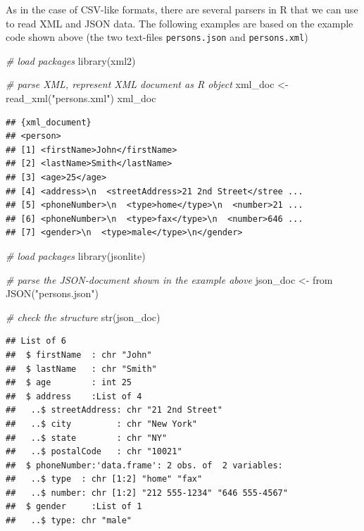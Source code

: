 \documentclass[
  12pt,
]{style/krantz}
\newenvironment{Shaded}{\begin{snugshade}}{\end{snugshade}}
\newcommand{\CommentTok}[1]{\textcolor[rgb]{0.56,0.35,0.01}{\textit{#1}}}
\newcommand{\FunctionTok}[1]{\textcolor[rgb]{0.00,0.00,0.00}{#1}}
\newcommand{\NormalTok}[1]{#1}
\newcommand{\OtherTok}[1]{\textcolor[rgb]{0.56,0.35,0.01}{#1}}
\newcommand{\StringTok}[1]{\textcolor[rgb]{0.31,0.60,0.02}{#1}}
\begin{document}
As in the case of CSV-like formats, there are several parsers in R that we can use to read XML and JSON data. The following examples are based on the example code shown above (the two text-files \texttt{persons.json} and \texttt{persons.xml})

\begin{Shaded}
\begin{Highlighting}[]
\CommentTok{\# load packages}
\FunctionTok{library}\NormalTok{(xml2)}

\CommentTok{\# parse XML, represent XML document as R object}
\NormalTok{xml\_doc }\OtherTok{\textless{}{-}} \FunctionTok{read\_xml}\NormalTok{(}\StringTok{"persons.xml"}\NormalTok{)}
\NormalTok{xml\_doc}
\end{Highlighting}
\end{Shaded}

\begin{verbatim}
## {xml_document}
## <person>
## [1] <firstName>John</firstName>
## [2] <lastName>Smith</lastName>
## [3] <age>25</age>
## [4] <address>\n  <streetAddress>21 2nd Street</stree ...
## [5] <phoneNumber>\n  <type>home</type>\n  <number>21 ...
## [6] <phoneNumber>\n  <type>fax</type>\n  <number>646 ...
## [7] <gender>\n  <type>male</type>\n</gender>
\end{verbatim}

\begin{Shaded}
\begin{Highlighting}[]
\CommentTok{\# load packages}
\FunctionTok{library}\NormalTok{(jsonlite)}

\CommentTok{\# parse the JSON{-}document shown in the example above}
\NormalTok{json\_doc }\OtherTok{\textless{}{-}}\NormalTok{ from }\FunctionTok{JSON}\NormalTok{(}\StringTok{"persons.json"}\NormalTok{)}

\CommentTok{\# check the structure}
\FunctionTok{str}\NormalTok{(json\_doc)}
\end{Highlighting}
\end{Shaded}

\begin{verbatim}
## List of 6
##  $ firstName  : chr "John"
##  $ lastName   : chr "Smith"
##  $ age        : int 25
##  $ address    :List of 4
##   ..$ streetAddress: chr "21 2nd Street"
##   ..$ city         : chr "New York"
##   ..$ state        : chr "NY"
##   ..$ postalCode   : chr "10021"
##  $ phoneNumber:'data.frame': 2 obs. of  2 variables:
##   ..$ type  : chr [1:2] "home" "fax"
##   ..$ number: chr [1:2] "212 555-1234" "646 555-4567"
##  $ gender     :List of 1
##   ..$ type: chr "male"
\end{verbatim}
\end{document}
